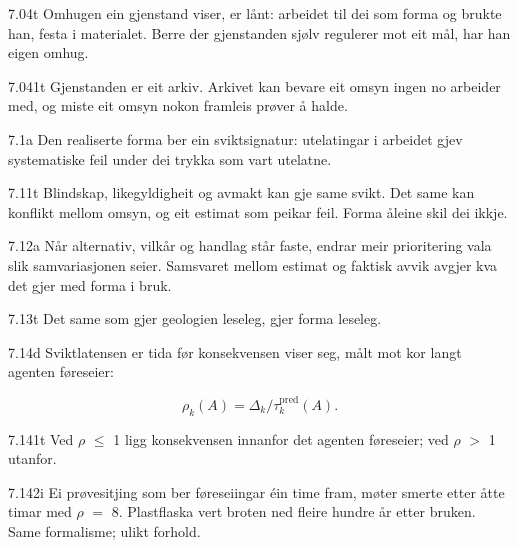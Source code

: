 \begin{formproposition}{7.04}{t}
Omhugen ein gjenstand viser, er lånt: arbeidet til dei som forma og brukte han, festa i materialet. Berre der gjenstanden sjølv regulerer mot eit mål, har han eigen omhug.
\end{formproposition}

\begin{formproposition}{7.041}{t}
Gjenstanden er eit arkiv. Arkivet kan bevare eit omsyn ingen no arbeider med, og miste eit omsyn nokon framleis prøver å halde.
\end{formproposition}

\begin{formproposition}{7.1}{a}
Den realiserte forma ber ein sviktsignatur: utelatingar i arbeidet gjev systematiske feil under dei trykka som vart utelatne.
\end{formproposition}

\begin{formproposition}{7.11}{t}
Blindskap, likegyldigheit og avmakt kan gje same svikt. Det same kan konflikt mellom omsyn, og eit estimat som peikar feil. Forma åleine skil dei ikkje.
\end{formproposition}

\begin{formproposition}{7.12}{a}
Når alternativ, vilkår og handlag står faste, endrar meir prioritering vala slik samvariasjonen seier. Samsvaret mellom estimat og faktisk avvik avgjer kva det gjer med forma i bruk.
\end{formproposition}

\begin{formproposition}{7.13}{t}
Det same som gjer geologien leseleg, gjer forma leseleg.
\end{formproposition}

\begin{formproposition}{7.14}{d}
Sviktlatensen er tida før konsekvensen viser seg, målt mot kor langt agenten føreseier:

\[
\rho_k(A)=\Delta_k/\tau^{\mathrm{pred}}_k(A).
\]
\end{formproposition}

\begin{formproposition}{7.141}{t}
Ved \(ρ\) \(≤\) 1 ligg konsekvensen innanfor det agenten føreseier; ved \(ρ\) \(>\) 1 utanfor.
\end{formproposition}

\begin{formproposition}{7.142}{i}
Ei prøvesitjing som ber føreseiingar éin time fram, møter smerte etter åtte timar med \(ρ\) \(=\) 8. Plastflaska vert broten ned fleire hundre år etter bruken. Same formalisme; ulikt forhold.
\end{formproposition}

